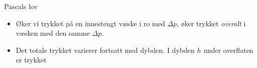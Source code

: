 \documentclass[aspectratio=169, 12pt]{beamer}
\begin{document}
\begin{frame}{Pascals lov}

  \begin{itemize}
    \item Øker vi trykket på en innestengt væske i ro med $\Delta p$, øker trykket \textit{overalt} i væsken med den samme $\Delta p$.
    \item<2-> Det totale trykket varierer fortsatt med dybden. I dybden $h$ under overflaten er trykket
  \end{itemize}

\end{frame}
\end{document}
